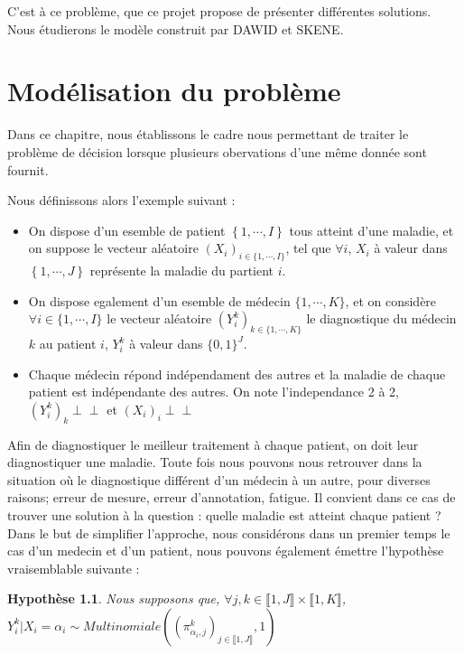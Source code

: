 \documentclass[frenchb]{report}
\newcommand{\1}{\mathbbm{1}}
\newcommand{\indep}{\perp \!\!\! \perp}
\newtheorem{hyp}{Hypothèse}
\theoremstyle{definition}\newtheorem{defn}{Définition}
\theoremstyle{definition}\newtheorem{exm}{Exemple}
\theoremstyle{definition}\newtheorem{nota}{Notation}
\theoremstyle{definition}\newtheorem{rem}{Remarque}
\begin{document}
C'est à ce problème, que ce projet propose de présenter différentes solutions. Nous étudierons le modèle construit par DAWID et SKENE.


\newpage

\chapter{Modélisation du problème}

Dans ce chapitre, nous établissons le cadre nous permettant de traiter le problème de décision lorsque plusieurs obervations d'une même donnée sont fournit. 

Nous définissons alors l'exemple suivant : 

\begin{itemize}[label=\adfflowerleft]
	\item On dispose d'un esemble de patient $\left\{1,\cdots,I\right\}$ tous atteint d'une maladie, et on suppose le vecteur aléatoire $(X_i)_{i \in \{1,\cdots,I \}}$, tel que $\forall i$, $X_i$ à valeur dans $\left\{1,\cdots,J\right\}$ représente la maladie du partient $i$.
	\item On dispose egalement d'un esemble de médecin $\{1, \cdots, K\}$, et on considère $\forall i \in \{1, \cdots, I\}$ le vecteur aléatoire $(Y^k_i)_{k \in \{1, \cdots, K\}}$ le diagnostique du médecin $k$ au patient $i$, $Y^k_i$ à valeur dans $\{0,1\}^J$. 
	\item Chaque médecin répond indépendament des autres et la maladie de chaque patient est indépendante des autres. On note l'independance 2 à 2, $(Y^k_i)_k \indep$ et $(X_i)_i \indep$
\end{itemize}

Afin de diagnostiquer le meilleur traitement à chaque patient, on doit leur diagnostiquer une maladie. Toute fois nous pouvons nous retrouver dans la situation où le diagnostique différent d'un médecin à un autre, pour diverses raisons; erreur de mesure, erreur d'annotation, fatigue. Il convient dans ce cas de trouver une solution à la question : quelle maladie est atteint chaque patient ? \\

Dans le but de simplifier l'approche, nous considérons dans un premier temps le cas d'un medecin et d'un patient, nous pouvons également émettre l'hypothèse vraisemblable suivante : \\

\begin{hyp}
	Nous supposons que, $\forall j,k \in \llbracket 1,J \rrbracket \times \llbracket 1,K \rrbracket$, $Y^k_i | X_i = \alpha_i \sim Multinomiale((\pi^k_{\alpha_i,j})_{j \in \llbracket 1,J \rrbracket},1)$
\end{hyp}
\end{document}
